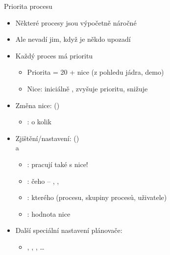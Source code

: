 \begin{frame}{Priorita procesu}

  \begin{itemize}
    \item Některé procesy jsou výpočetně náročné

    \pause

    \item Ale nevadí jim, když je někdo upozadí

    \pause

    \item Každý proces má prioritu
    \begin{itemize}
      \item Priorita = 20 + nice (z pohledu jádra, demo)

      \pause

      \item Nice: iniciálně ,  zvyšuje prioritu, 
	snižuje
    \end{itemize}

    \pause

    \item Změna nice:  ()
    \begin{itemize}
      \item {}: o kolik
    \end{itemize}

    \pause

    \item Zjištění/nastavení: () \\
       a
    \begin{itemize}
      \item \pozor: pracují také s nice!
      \item {}: čeho -- , ,
      \item {}: kterého (procesu, skupiny procesů, uživatele)
      \item {}: hodnota nice
    \end{itemize}

    \pause

    \item Další speciální nastavení plánovače: 
    \begin{itemize}
      \item {}, ,
	, \dots
    \end{itemize}

  \end{itemize}

\end{frame}

